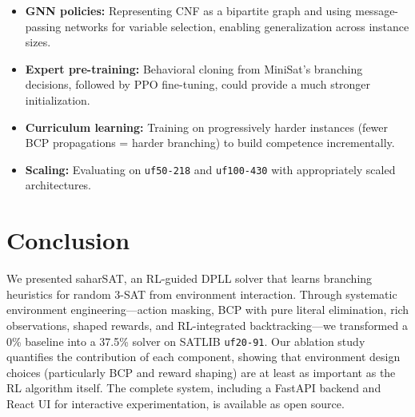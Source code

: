 \documentclass{article}
\begin{document}
\begin{itemize}
    \item \textbf{GNN policies:} Representing CNF as a bipartite graph and using message-passing networks for variable selection, enabling generalization across instance sizes.
    \item \textbf{Expert pre-training:} Behavioral cloning from MiniSat's branching decisions, followed by PPO fine-tuning, could provide a much stronger initialization.
    \item \textbf{Curriculum learning:} Training on progressively harder instances (fewer BCP propagations = harder branching) to build competence incrementally.
    \item \textbf{Scaling:} Evaluating on \texttt{uf50-218} and \texttt{uf100-430} with appropriately scaled architectures.
\end{itemize}

\section{Conclusion}

We presented saharSAT, an RL-guided DPLL solver that learns branching heuristics for random 3-SAT from environment interaction. Through systematic environment engineering---action masking, BCP with pure literal elimination, rich observations, shaped rewards, and RL-integrated backtracking---we transformed a 0\% baseline into a 37.5\% solver on SATLIB \texttt{uf20-91}. Our ablation study quantifies the contribution of each component, showing that environment design choices (particularly BCP and reward shaping) are at least as important as the RL algorithm itself. The complete system, including a FastAPI backend and React UI for interactive experimentation, is available as open source.



\end{document}
